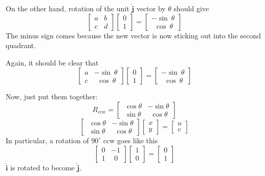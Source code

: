 \documentclass[11pt, oneside]{report}   	%
\begin{document}
On the other hand, rotation of the unit $\hat{\mathbf{j}}$ vector by $\theta$ should give
\[
\begin{bmatrix}  
a & b  \\  
c & d  
\end{bmatrix}
\begin{bmatrix}  
0  \\  
1  
\end{bmatrix}
=
\begin{bmatrix}  
-\sin \  \theta  \\  
\ \ \cos \  \theta  
\end{bmatrix}
\]
The minus sign comes because the new vector is now sticking out into the second quadrant.

Again, it should be clear that 
\[
\begin{bmatrix}  
a & -\sin \  \theta  \\  
c & \ \ \cos \  \theta  
\end{bmatrix}
\begin{bmatrix}  
0  \\  
1  
\end{bmatrix}
=
\begin{bmatrix}  
-\sin \  \theta  \\  
\ \ \cos \  \theta  
\end{bmatrix}
\]

Now, just put them together:
\[
R_{ccw} = 
\begin{bmatrix}   \ \cos \theta & -\sin \theta  \\  \ \sin \theta & \ \ \cos \theta  \end{bmatrix}
\]
\[
\begin{bmatrix}   \ \cos \theta & -\sin \theta  \\  \ \sin \theta & \ \ \cos \theta  \end{bmatrix}
\begin{bmatrix}   x   \\  y  \end{bmatrix} = \begin{bmatrix}   u   \\  v  \end{bmatrix}
\]
In particular, a rotation of $90^{\circ}$ ccw goes like this
\[
\begin{bmatrix}   0 & -1  \\  1 & \ \ 0  \end{bmatrix}
\begin{bmatrix}   1   \\  0  \end{bmatrix} = \begin{bmatrix}   0   \\  1  \end{bmatrix}
\]
$\hat{\mathbf{i}}$ is rotated to become $\hat{\mathbf{j}}$.
\end{document}
